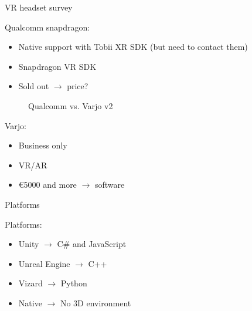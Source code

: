\documentclass{beamer}
\begin{document}
\begin{frame}{VR headset survey}

	Qualcomm snapdragon:
	\begin{itemize}
		\item Native support with Tobii XR SDK (but need to contact them)
		\item Snapdragon VR SDK
		\item Sold out $\rightarrow$ price?
	\end{itemize}

	\begin{figure}
		\centering
		\qquad
		\caption{Qualcomm vs. Varjo v2}%
	\end{figure}

	Varjo:
	\begin{itemize}
		\item Business only
		\item VR/AR
		\item €5000 and more $\rightarrow$ software
	\end{itemize}
\end{frame}

\begin{frame}{Platforms}
	
	Platforms:
	\begin{itemize}
		\item Unity $\rightarrow$ C# and JavaScript
		\item Unreal Engine $\rightarrow$ C++
		\item Vizard  $\rightarrow$ Python
		\item Native  $\rightarrow$ No 3D environment
	\end{itemize}

\end{frame}
\end{document}
